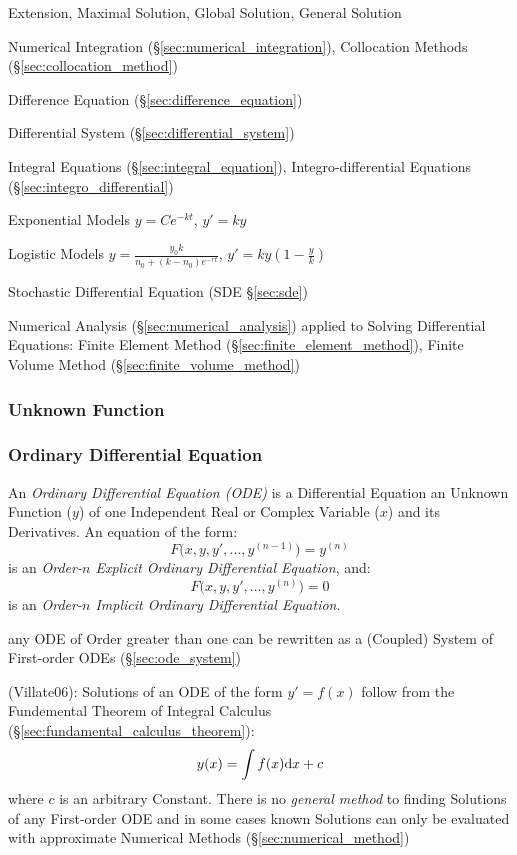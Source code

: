 Extension, Maximal Solution, Global Solution, General Solution

\fist Numerical Integration (\S\ref{sec:numerical_integration}), Collocation
Methods (\S\ref{sec:collocation_method})

\fist Difference Equation (\S\ref{sec:difference_equation})

\fist Differential System (\S\ref{sec:differential_system})

\fist Integral Equations (\S\ref{sec:integral_equation}), Integro-differential
Equations (\S\ref{sec:integro_differential})

Exponential Models $y = Ce^{-kt}$, $y' = ky$

Logistic Models $y = \frac{y_0 k}{n_0 + (k-n_0)e^{-rt}}$,
  $y' = ky (1 - \frac{y}{k})$

\fist Stochastic Differential Equation (SDE \S\ref{sec:sde})

\fist Numerical Analysis (\S\ref{sec:numerical_analysis}) applied to Solving
Differential Equations: Finite Element Method
(\S\ref{sec:finite_element_method}), Finite Volume Method
(\S\ref{sec:finite_volume_method})



\subsubsection{Unknown Function}\label{sec:unknown_function}

\subsubsection{Ordinary Differential Equation}\label{sec:ode}

An \emph{Ordinary Differential Equation (ODE)} is a Differential Equation an
Unknown Function ($y$) of one Independent Real or Complex Variable ($x$) and its
Derivatives. An equation of the form:
\[
  F\Big(x,y,y',\ldots,y^{(n-1)}\Big) = y^{(n)}
\]
is an \emph{Order-$n$ Explicit Ordinary Differential Equation}, and:
\[
  F\Big(x,y,y',\ldots,y^{(n)}\Big) = 0
\]
is an \emph{Order-$n$ Implicit Ordinary Differential Equation}.

any ODE of Order greater than one can be rewritten as a (Coupled) System of
First-order ODEs (\S\ref{sec:ode_system})

(Villate06): Solutions of an ODE of the form $y' = f(x)$ follow from the
Fundemental Theorem of Integral Calculus
(\S\ref{sec:fundamental_calculus_theorem}):
\[
y(x) = \int f(x) \mathrm{d}x + c
\]
where $c$ is an arbitrary Constant. There is no \emph{general method} to finding
Solutions of any First-order ODE and in some cases known Solutions can only be
evaluated with approximate Numerical Methods (\S\ref{sec:numerical_method})

